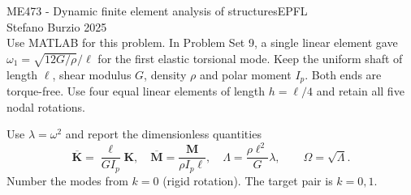 \documentclass[12pt]{article}
\newcommand{\bK}{\overline{\mathbf K}}
\newcommand{\bM}{\overline{\mathbf M}}
\newcommand{\vct}[1]{\mathbf{#1}}
\begin{document}
\noindent ME473 - Dynamic finite element analysis of structures\hfill EPFL\\
Stefano Burzio \hfill 2025\\
\vspace{0.3cm}
Use MATLAB for this problem. In Problem Set 9, a single linear element gave
$\omega_1=\sqrt{12G/\rho}/\ell$ for the first elastic torsional mode. Keep the
uniform shaft of length $\ell$, shear modulus $G$, density $\rho$ and polar
moment $I_p$. Both ends are torque-free. Use four equal linear elements of
length $h=\ell/4$ and retain all five nodal rotations.
\begin{center}
\end{center}
Use $\lambda=\omega^2$ and report the dimensionless quantities
\[
  \bK=\frac{\ell}{GI_p}\vct K,\quad
  \bM=\frac{\vct M}{\rho I_p\ell},\quad
  \Lambda=\frac{\rho\ell^2}{G}\lambda,\qquad
  \Omega=\sqrt{\Lambda}.
\]
Number the modes from $k=0$ (rigid rotation). The target pair is $k=0,1$.
\end{document}
